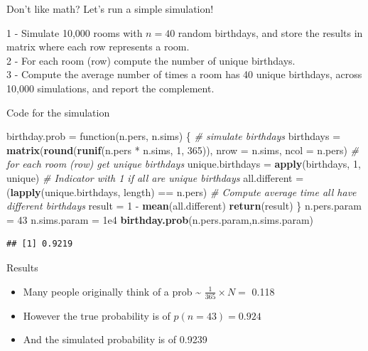 \documentclass[ignorenonframetext,]{beamer}
\newenvironment{Shaded}{\begin{snugshade}}{\end{snugshade}}
\newcommand{\KeywordTok}[1]{\textcolor[rgb]{0.13,0.29,0.53}{\textbf{{#1}}}}
\newcommand{\DataTypeTok}[1]{\textcolor[rgb]{0.13,0.29,0.53}{{#1}}}
\newcommand{\DecValTok}[1]{\textcolor[rgb]{0.00,0.00,0.81}{{#1}}}
\newcommand{\FloatTok}[1]{\textcolor[rgb]{0.00,0.00,0.81}{{#1}}}
\newcommand{\StringTok}[1]{\textcolor[rgb]{0.31,0.60,0.02}{{#1}}}
\newcommand{\CommentTok}[1]{\textcolor[rgb]{0.56,0.35,0.01}{\textit{{#1}}}}
\newcommand{\NormalTok}[1]{{#1}}
\providecommand{\tightlist}{%
\setlength{\itemsep}{0pt}\setlength{\parskip}{0pt}}
\begin{document}
\begin{frame}{Don't like math? Let's run a simple simulation!}

1 - Simulate 10,000 rooms with \(n = 40\) random birthdays, and store
the results in matrix where each row represents a room.\\
2 - For each room (row) compute the number of unique birthdays.\\
3 - Compute the average number of times a room has 40 unique birthdays,
across 10,000 simulations, and report the complement.

\end{frame}

\begin{frame}[fragile]{Code for the simulation}

\begin{Shaded}
\begin{Highlighting}[]
\NormalTok{birthday.prob =}\StringTok{ }\NormalTok{function(n.pers, n.sims) \{}
  \CommentTok{# simulate birthdays}
  \NormalTok{birthdays =}\StringTok{ }\KeywordTok{matrix}\NormalTok{(}\KeywordTok{round}\NormalTok{(}\KeywordTok{runif}\NormalTok{(n.pers *}\StringTok{ }\NormalTok{n.sims, }\DecValTok{1}\NormalTok{, }\DecValTok{365}\NormalTok{)), }
                      \DataTypeTok{nrow =} \NormalTok{n.sims, }\DataTypeTok{ncol =} \NormalTok{n.pers)}
  \CommentTok{# for each room (row) get unique birthdays}
  \NormalTok{unique.birthdays =}\StringTok{ }\KeywordTok{apply}\NormalTok{(birthdays, }\DecValTok{1}\NormalTok{, unique)}
  \CommentTok{# Indicator with 1 if all are unique birthdays}
  \NormalTok{all.different =}\StringTok{ }\NormalTok{(}\KeywordTok{lapply}\NormalTok{(unique.birthdays, length) ==}\StringTok{ }\NormalTok{n.pers)}
  \CommentTok{# Compute average time all have different birthdays }
  \NormalTok{result =}\StringTok{ }\DecValTok{1} \NormalTok{-}\StringTok{ }\KeywordTok{mean}\NormalTok{(all.different)}
\KeywordTok{return}\NormalTok{(result)}
\NormalTok{\}}
\NormalTok{n.pers.param =}\StringTok{ }\DecValTok{43}
\NormalTok{n.sims.param =}\StringTok{ }\FloatTok{1e4}
\KeywordTok{birthday.prob}\NormalTok{(n.pers.param,n.sims.param)}
\end{Highlighting}
\end{Shaded}

\begin{verbatim}
## [1] 0.9219
\end{verbatim}

\end{frame}

\begin{frame}{Results}

\begin{itemize}
\tightlist
\item
  Many people originally think of a prob \textasciitilde{}
  \(\frac{1}{365} \times N =\) 0.118
\item
  However the true probability is of \(p(n= 43) = 0.924\)
\item
  And the simulated probability is of 0.9239
\end{itemize}

\end{frame}
\end{document}
